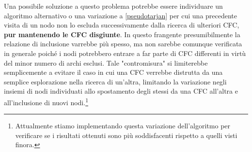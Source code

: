 \documentclass[10pt,a4paper]{article}
\begin{document}
Una possibile soluzione a questo problema potrebbe essere individuare un algoritmo alternativo o una variazione a \ref{pseudotarjan} per cui una precedente visita di un nodo non lo  escluda successivamente dalla ricerca di ulteriori CFC, \textbf{pur mantenendo le CFC disgiunte}. In questo frangente presumibilmente la relazione di inclusione varrebbe più spesso, ma non sarebbe comunque verificata in generale poiché i nodi potrebbero entrare a far parte di CFC differenti in virtù del minor numero di archi esclusi. Tale "contromisura" si limiterebbe semplicemente a evitare il caso in cui una CFC verrebbe distrutta da una semplice esplorazione nella ricerca di un'altra, limitando la variazione negli insiemi di nodi individuati allo spostamento degli stessi da una CFC all'altra e all'inclusione di nuovi nodi.\footnote{Attualmente stiamo implementando questa variazione dell'algoritmo per verificare se i risultati ottenuti sono più soddisfacenti rispetto a quelli visti finora.}
\end{document}
